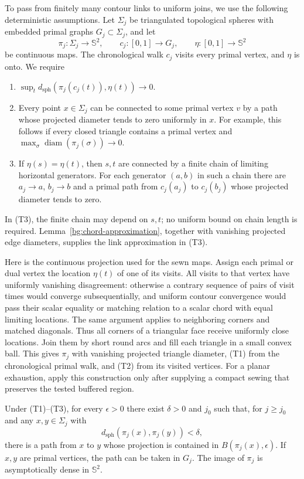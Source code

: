 To pass from finitely many contour links to uniform joins, we use the
following deterministic assumptions. Let $\Sigma_j$ be triangulated
topological spheres with embedded primal graphs $G_j\subset\Sigma_j$,
and let
\[
 \pi_j:\Sigma_j\longrightarrow\mathbb S^2,
 \qquad c_j:[0,1]\longrightarrow G_j,
 \qquad \eta:[0,1]\longrightarrow\mathbb S^2
\]
be continuous maps. The chronological walk $c_j$ visits every primal
vertex, and $\eta$ is onto. We require
\begin{enumerate}[label=(T\arabic*)]
\item $\sup_t d_{\mathrm{sph}}(\pi_j(c_j(t)),\eta(t))\to0$.
\item Every point $x\in\Sigma_j$ can be connected to some primal
vertex $v$ by a path whose projected diameter tends to zero uniformly
in $x$. For example, this follows if every closed triangle contains a
primal vertex and
$\max_{\sigma}\operatorname{diam}(\pi_j(\sigma))\to0$.
\item If $\eta(s)=\eta(t)$, then $s,t$ are connected by a finite chain
of limiting horizontal generators. For each generator $(a,b)$ in
such a chain there are $a_j\to a$, $b_j\to b$ and a primal path from
$c_j(a_j)$ to $c_j(b_j)$ whose projected diameter tends to zero.
\end{enumerate}
In (T3), the finite chain may depend on $s,t$; no uniform bound on
chain length is required.
Lemma~\ref{bg:chord-approximation}, together with vanishing projected
edge diameters, supplies the link approximation in (T3).

Here is the continuous projection used for the sewn maps. Assign each
primal or dual vertex the location $\eta(t)$ of one of its visits.
All visits to that vertex have uniformly vanishing disagreement:
otherwise a contrary sequence of pairs of visit times would converge
subsequentially, and uniform contour convergence would pass their
scalar equality or matching relation to a scalar chord with equal
limiting locations. The same argument applies to neighboring corners
and matched diagonals. Thus all corners of a triangular face receive
uniformly close locations. Join them by short round arcs and fill each
triangle in a small convex ball. This gives $\pi_j$ with vanishing
projected triangle diameter, (T1) from the chronological primal walk,
and (T2) from its visited vertices. For a planar exhaustion, apply
this construction only after supplying a compact sewing that preserves
the tested buffered region.

\begin{lemma}
\label{bg:small-image-joining}
Under (T1)--(T3), for every $\epsilon>0$ there exist $\delta>0$ and
$j_0$ such that, for $j\ge j_0$ and any $x,y\in\Sigma_j$ with
\[
 d_{\mathrm{sph}}(\pi_j(x),\pi_j(y))<\delta,
\]
there is a path from $x$ to $y$ whose projection is contained in
$B(\pi_j(x),\epsilon)$. If $x,y$ are primal vertices, the path can be
taken in $G_j$. The image of $\pi_j$ is asymptotically dense in
$\mathbb S^2$.
\end{lemma}

